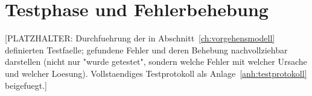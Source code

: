 \chapter{Testphase und Fehlerbehebung}
\label{ch:testphase_und_fehlerbehebung}

[PLATZHALTER: Durchfuehrung der in
Abschnitt~\ref{ch:vorgehensmodell} definierten Testfaelle; gefundene Fehler
und deren Behebung nachvollziehbar darstellen (nicht nur "wurde getestet",
sondern welche Fehler mit welcher Ursache und welcher Loesung). Vollstaendiges
Testprotokoll als Anlage~\ref{anh:testprotokoll} beigefuegt.]
